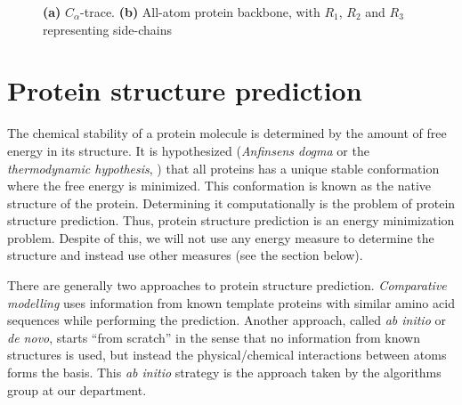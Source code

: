 

\begin{figure}
  \centering
  \caption{\textbf{(a)} $C_{\alpha}$-trace. \textbf{(b)} All-atom protein backbone, with $R_1$, $R_2$ and $R_3$ representing side-chains}
\end{figure}

\section{Protein structure prediction}
The chemical stability of a protein molecule is determined by the
amount of free energy in its structure. It is hypothesized
(\textit{Anfinsens dogma} or the \textit{thermodynamic hypothesis},
\cite{anfinsen73, soundararajan2010}) that all proteins has a unique
stable conformation where the free energy is minimized. This
conformation is known as the native structure of the
protein. Determining it computationally is the problem of protein
structure prediction. Thus, protein structure prediction is an energy
minimization problem. Despite of this, we will not use any energy
measure to determine the structure and instead use other measures (see
the section below).


There are generally two approaches to protein structure prediction.
\textit{Comparative modelling} uses information from known template
proteins with similar amino acid sequences while performing the
prediction. Another approach, called \textit{ab initio} or
\textit{de novo}, starts ``from scratch'' in the sense that no
information from known structures is used, but instead the
physical/chemical interactions between atoms forms the basis. This
\textit{ab initio} strategy is the approach taken by the algorithms
group at our department.

